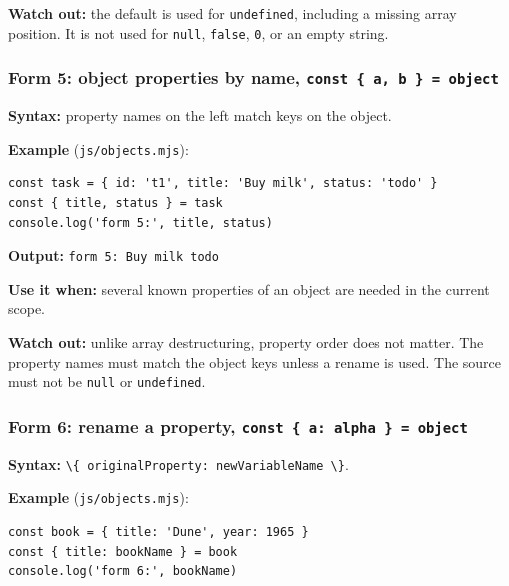 \documentclass[
]{article}
\newcommand{\passthrough}[1]{#1}
\begin{document}
\textbf{Watch out:} the default is used for
\passthrough{\lstinline!undefined!}, including a missing array position.
It is not used for \passthrough{\lstinline!null!},
\passthrough{\lstinline!false!}, \passthrough{\lstinline!0!}, or an
empty string.

\subsubsection{\texorpdfstring{Form 5: object properties by name,
\texttt{const\ \{\ a,\ b\ \}\ =\ object}}{Form 5: object properties by name, const \{ a, b \} = object}}\label{form-5-object-properties-by-name-const--a-b---object}

\textbf{Syntax:} property names on the left match keys on the object.

\textbf{Example} (\passthrough{\lstinline!js/objects.mjs!}):

\begin{lstlisting}
const task = { id: 't1', title: 'Buy milk', status: 'todo' }
const { title, status } = task
console.log('form 5:', title, status)
\end{lstlisting}

\textbf{Output:} \passthrough{\lstinline!form 5: Buy milk todo!}

\textbf{Use it when:} several known properties of an object are needed
in the current scope.

\textbf{Watch out:} unlike array destructuring, property order does not
matter. The property names must match the object keys unless a rename is
used. The source must not be \passthrough{\lstinline!null!} or
\passthrough{\lstinline!undefined!}.

\subsubsection{\texorpdfstring{Form 6: rename a property,
\texttt{const\ \{\ a:\ alpha\ \}\ =\ object}}{Form 6: rename a property, const \{ a: alpha \} = object}}\label{form-6-rename-a-property-const--a-alpha---object}

\textbf{Syntax:}
\passthrough{\lstinline!\{ originalProperty: newVariableName \}!}.

\textbf{Example} (\passthrough{\lstinline!js/objects.mjs!}):

\begin{lstlisting}
const book = { title: 'Dune', year: 1965 }
const { title: bookName } = book
console.log('form 6:', bookName)
\end{lstlisting}
\end{document}
